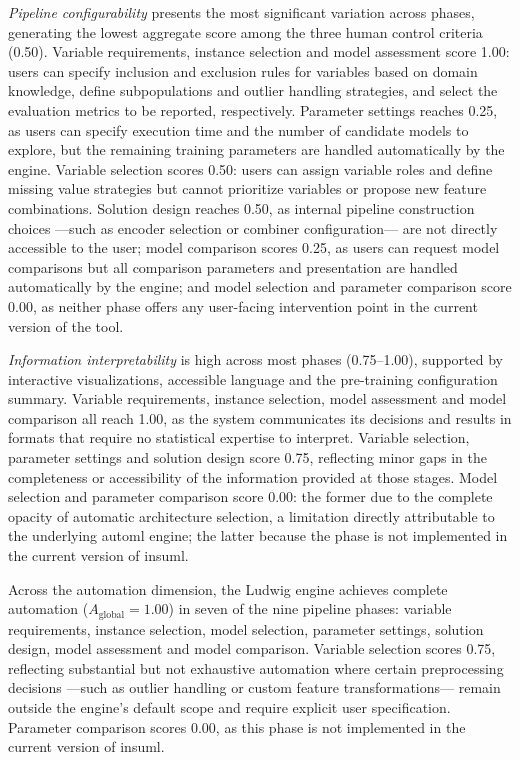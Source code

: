 \documentclass[a4paper,twoside]{article}
\begin{document}
\emph{Pipeline configurability} presents the most significant variation
across phases, generating the lowest aggregate score among the three human
control criteria (0.50). Variable requirements, instance selection and model
assessment score 1.00: users can specify inclusion and exclusion rules for
variables based on domain knowledge, define subpopulations and outlier
handling strategies, and select the evaluation metrics to be reported,
respectively. Parameter settings reaches 0.25, as users can specify execution
time and the number of candidate models to explore, but the remaining training
parameters are handled automatically by the engine. Variable selection scores
0.50: users can assign variable roles and define missing value strategies but
cannot prioritize variables or propose new feature combinations. Solution
design reaches 0.50, as internal pipeline construction choices ---such as
encoder selection or combiner configuration--- are not directly accessible to
the user; model comparison scores 0.25, as users can request model comparisons
but all comparison parameters and presentation are handled automatically by
the engine; and model selection and parameter comparison score 0.00, as
neither phase offers any user-facing intervention point in the current version
of the tool.

\emph{Information interpretability} is high across most phases
(0.75--1.00), supported by interactive visualizations, accessible language
and the pre-training configuration summary. Variable requirements, instance
selection, model assessment and model comparison all reach 1.00, as the
system communicates its decisions and results in formats that require no
statistical expertise to interpret. Variable selection, parameter settings
and solution design score 0.75, reflecting minor gaps in the completeness
or accessibility of the information provided at those stages. Model selection
and parameter comparison score 0.00: the former due to the complete opacity
of automatic architecture selection, a limitation directly attributable to
the underlying \gls{automl} engine; the latter because the phase is not
implemented in the current version of \gls{insuml}.

Across the automation dimension, the Ludwig engine achieves complete
automation ($A_{\text{global}} = 1.00$) in seven of the nine pipeline
phases: variable requirements, instance selection, model selection,
parameter settings, solution design, model assessment and model comparison.
Variable selection scores 0.75, reflecting substantial but not exhaustive
automation where certain preprocessing decisions ---such as outlier handling
or custom feature transformations--- remain outside the engine's default
scope and require explicit user specification. Parameter comparison scores
0.00, as this phase is not implemented in the current version of
\gls{insuml}.
\end{document}
